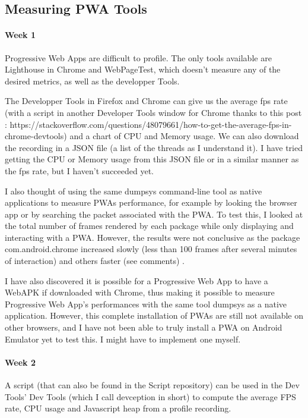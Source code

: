 \documentclass{kththesis}
\begin{document}
\subsection{Measuring PWA Tools}
\paragraph{Week 1}
Progressive Web Apps are difficult to profile. The only tools available are Lighthouse in Chrome and WebPageTest, which doesn't measure any of the desired metrics, as well as the developper Tools.

The Developper Tools in Firefox and Chrome can give us the average fps rate (with a script in another Developer Tools window for Chrome thanks to this post : https://stackoverflow.com/questions/48079661/how-to-get-the-average-fps-in-chrome-devtools) and a chart of CPU and Memory usage. We can also download the recording in a JSON file (a list of the threads as I understand it). I have tried getting the CPU or Memory usage from this JSON file or in a similar manner as the fps rate, but I haven't succeeded yet. 

I also thought of using the same dumpsys command-line tool as native applications to measure PWAs performance, for example by looking the browser app or by searching the packet associated with the PWA. To test this,  I looked at the total number of frames rendered by each package while only displaying and interacting with a PWA. However, the results were not conclusive as the package com.android.chrome increased slowly (less than 100 frames after several minutes of interaction) and others faster (see comments) %
. 

I have also discovered it is possible for a Progressive Web App to have a WebAPK if downloaded with Chrome, thus making it possible to measure Progressive Web App's performances with the same tool dumpsys as a native application. However, this complete installation of PWAs are still not available on other browsers, and I have not been able to truly install a PWA on Android Emulator yet to test this. I might have to implement one myself. 
\paragraph{Week 2}
 A script (that can also be found in the Script repository) can be used in the Dev Tools' Dev Tools (which I call devception in short) to compute the average FPS rate, CPU usage and Javascript heap from a profile recording.
\end{document}
